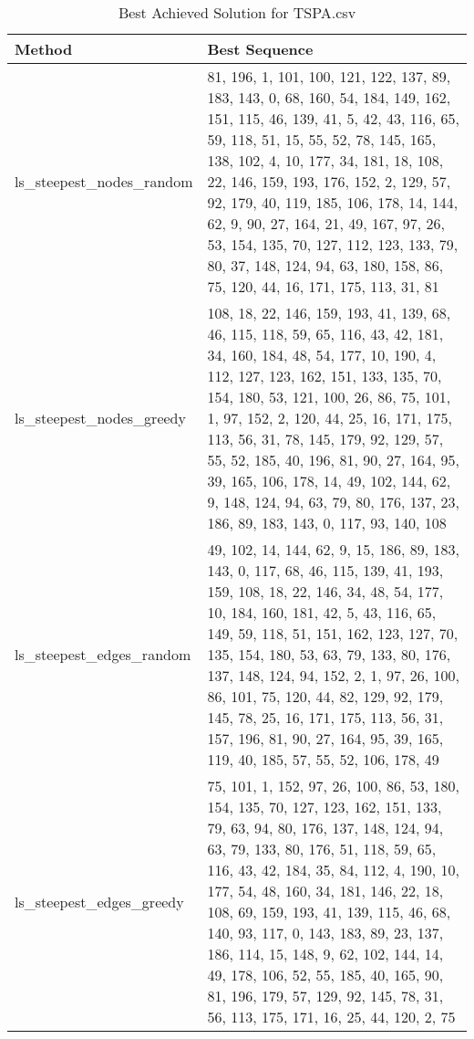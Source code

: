 \begin{table}[H] %
\centering
\caption{Best Achieved Solution for TSPA.csv}
\label{tab:tsbp_best_sequence}
\begin{tabular}{|p{0.25\linewidth}|p{0.75\linewidth}|} %
\hline
\textbf{Method} & \textbf{Best Sequence} \\
\hline
ls\_steepest\_nodes\_random & 81, 196, 1, 101, 100, 121, 122, 137, 89, 183, 143, 0, 68, 160, 54, 184, 149, 162, 151, 115, 46, 139, 41, 5, 42, 43, 116, 65, 59, 118, 51, 15, 55, 52, 78, 145, 165, 138, 102, 4, 10, 177, 34, 181, 18, 108, 22, 146, 159, 193, 176, 152, 2, 129, 57, 92, 179, 40, 119, 185, 106, 178, 14, 144, 62, 9, 90, 27, 164, 21, 49, 167, 97, 26, 53, 154, 135, 70, 127, 112, 123, 133, 79, 80, 37, 148, 124, 94, 63, 180, 158, 86, 75, 120, 44, 16, 171, 175, 113, 31, 81 \\
\hline
ls\_steepest\_nodes\_greedy & 108, 18, 22, 146, 159, 193, 41, 139, 68, 46, 115, 118, 59, 65, 116, 43, 42, 181, 34, 160, 184, 48, 54, 177, 10, 190, 4, 112, 127, 123, 162, 151, 133, 135, 70, 154, 180, 53, 121, 100, 26, 86, 75, 101, 1, 97, 152, 2, 120, 44, 25, 16, 171, 175, 113, 56, 31, 78, 145, 179, 92, 129, 57, 55, 52, 185, 40, 196, 81, 90, 27, 164, 95, 39, 165, 106, 178, 14, 49, 102, 144, 62, 9, 148, 124, 94, 63, 79, 80, 176, 137, 23, 186, 89, 183, 143, 0, 117, 93, 140, 108 \\
\hline
ls\_steepest\_edges\_random & 49, 102, 14, 144, 62, 9, 15, 186, 89, 183, 143, 0, 117, 68, 46, 115, 139, 41, 193, 159, 108, 18, 22, 146, 34, 48, 54, 177, 10, 184, 160, 181, 42, 5, 43, 116, 65, 149, 59, 118, 51, 151, 162, 123, 127, 70, 135, 154, 180, 53, 63, 79, 133, 80, 176, 137, 148, 124, 94, 152, 2, 1, 97, 26, 100, 86, 101, 75, 120, 44, 82, 129, 92, 179, 145, 78, 25, 16, 171, 175, 113, 56, 31, 157, 196, 81, 90, 27, 164, 95, 39, 165, 119, 40, 185, 57, 55, 52, 106, 178, 49 \\
\hline
ls\_steepest\_edges\_greedy & 75, 101, 1, 152, 97, 26, 100, 86, 53, 180, 154, 135, 70, 127, 123, 162, 151, 133, 79, 63, 94, 80, 176, 137, 148, 124, 94, 63, 79, 133, 80, 176, 51, 118, 59, 65, 116, 43, 42, 184, 35, 84, 112, 4, 190, 10, 177, 54, 48, 160, 34, 181, 146, 22, 18, 108, 69, 159, 193, 41, 139, 115, 46, 68, 140, 93, 117, 0, 143, 183, 89, 23, 137, 186, 114, 15, 148, 9, 62, 102, 144, 14, 49, 178, 106, 52, 55, 185, 40, 165, 90, 81, 196, 179, 57, 129, 92, 145, 78, 31, 56, 113, 175, 171, 16, 25, 44, 120, 2, 75 \\

\end{tabular}
\end{table}
